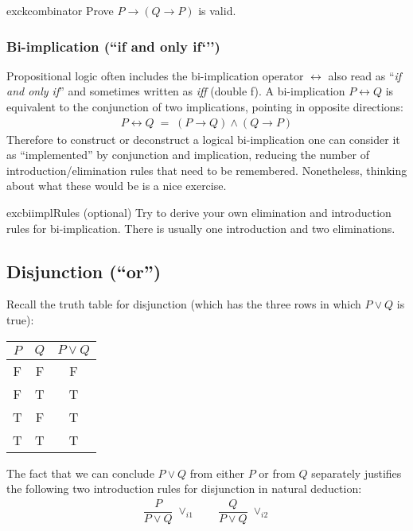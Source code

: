 \documentclass{article}
\theoremstyle{definition}
\begin{document}
\begin{restatable}{exc}{kcombinator}
Prove $P \rightarrow (Q \rightarrow P)$ is valid.
\end{restatable}

\subsubsection{Bi-implication  (``if and only if`'')}

Propositional logic often includes the bi-implication operator
$\leftrightarrow$ also read as ``\emph{if and only if}'' and sometimes
written as \emph{iff} (double f). A bi-implication $P \leftrightarrow Q$ is
equivalent to the conjunction of two implications, pointing in
opposite directions:
%
\begin{align*}
P \leftrightarrow Q \; = \; (P \rightarrow Q) \wedge (Q \rightarrow P)
\end{align*}
%
Therefore to construct or deconstruct a logical
bi-implication one can consider it as ``implemented'' by
conjunction and implication, reducing the number of
introduction/elimination rules that need to be
remembered. Nonetheless, thinking about what these would be
is a nice exercise.

\begin{restatable}{exc}{biimplRules} (optional)
Try to derive your own elimination and introduction rules for
bi-implication. There is usually one introduction and two eliminations.
\end{restatable}



\subsection{Disjunction (``or'')}

Recall the truth table for disjunction (which has the three rows
in which $P \vee Q$ is true):
%
\begin{center}
\begin{tabular}{cc|c}
  $P$ & $Q$ & $P \vee Q$ \\ \hline
  F & F & F \\
\rowcolor{yellow} F & T & T \\
\rowcolor{yellow}  T & F & T \\
\rowcolor{yellow}  T & T & T
\end{tabular}
\end{center}
%
The fact that we can conclude $P \vee Q$ from either $P$
or from $Q$ separately justifies the following two introduction
rules for disjunction in natural deduction:
%
\begin{align*}
  \dfrac{P}
  {P \vee Q} \; {\vee_{i1}}
  \qquad
    \dfrac{Q}
  {P \vee Q} \; {\vee_{i2}}
\end{align*}
%
\end{document}
